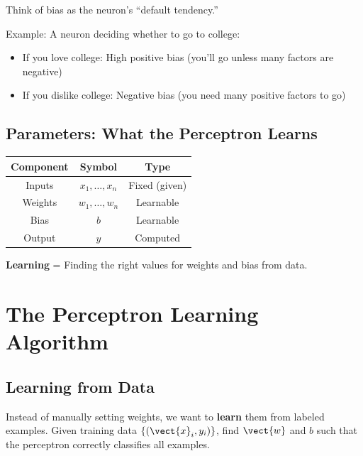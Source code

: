 \begin{bluebox}
Think of bias as the neuron's ``default tendency.'' 

Example: A neuron deciding whether to go to college:
\begin{itemize}
    \item If you love college: High positive bias (you'll go unless many factors are negative)
    \item If you dislike college: Negative bias (you need many positive factors to go)
\end{itemize}
\end{bluebox}

\subsection{Parameters: What the Perceptron Learns}

\begin{center}
\begin{tabular}{|c|c|c|}
\hline
\textbf{Component} & \textbf{Symbol} & \textbf{Type} \\ \hline
Inputs & $x_1, \ldots, x_n$ & Fixed (given) \\ \hline
Weights & $w_1, \ldots, w_n$ & Learnable \\ \hline
Bias & $b$ & Learnable \\ \hline
Output & $y$ & Computed \\ \hline
\end{tabular}
\end{center}

\textbf{Learning} = Finding the right values for weights and bias from data.


\section{The Perceptron Learning Algorithm}

\subsection{Learning from Data}

Instead of manually setting weights, we want to \textbf{learn} them from labeled examples. Given training data $\{(\vect{x}_i, y_i)\}$, find $\vect{w}$ and $b$ such that the perceptron correctly classifies all examples.

